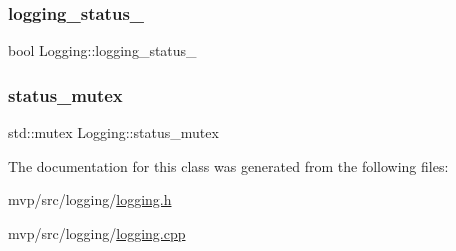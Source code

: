 \subsubsection{\texorpdfstring{logging\+\_\+status\+\_\+}{logging\_status\_}}
{\footnotesize\ttfamily bool Logging\+::logging\+\_\+status\+\_\+\hspace{0.3cm}{\ttfamily [private]}}

\mbox{\label{classLogging_a9bc75091ce35d1448abf90ee07fc7ffa}} 
\subsubsection{\texorpdfstring{status\+\_\+mutex}{status\_mutex}}
{\footnotesize\ttfamily std\+::mutex Logging\+::status\+\_\+mutex\hspace{0.3cm}{\ttfamily [private]}}



The documentation for this class was generated from the following files\+:\begin{DoxyCompactItemize}
\item 
mvp/src/logging/\hyperlink{logging_8h}{logging.\+h}\item 
mvp/src/logging/\hyperlink{logging_8cpp}{logging.\+cpp}\end{DoxyCompactItemize}
